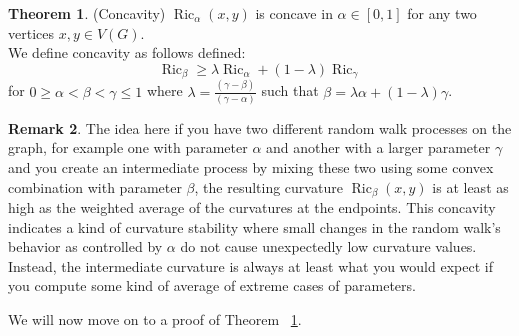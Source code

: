 \documentclass{Dissertate}
\theoremstyle{definition}
\newtheorem{theorem}{Theorem}[section]
\theoremstyle{definition} %
\theoremstyle{definition}
\newtheorem{remark}[theorem]{Remark}
\begin{document}
\begin{theorem} \label{thm: concavity}(Concavity) $\operatorname{Ric}_\alpha(x,y)$ is concave in $\alpha \in [0,1]$ for any two vertices $x,y \in V(G)$. \\
We define concavity as follows defined:
$$
\operatorname{Ric}_\beta \geq \lambda \operatorname{Ric}_\alpha + (1- \lambda) \operatorname{Ric}_\gamma
$$
for $0 \geq \alpha < \beta < \gamma \leq 1$ where
$\lambda = \frac{(\gamma - \beta)}{(\gamma - \alpha)}$ such that $\beta = \lambda\alpha + (1- \lambda)\gamma$.
\end{theorem}
\begin{remark} The idea here if you have two different random walk processes on the graph, for example one with parameter \(\alpha\) and another with a larger parameter \(\gamma\) and you create an intermediate process by mixing these two using some convex combination with parameter \(\beta\), the resulting curvature \(\operatorname{Ric}_\beta(x,y)\) is at least as high as the weighted average of the curvatures at the endpoints. This concavity indicates a kind of curvature stability where small changes in the random walk’s behavior as controlled by \(\alpha\) do not cause unexpectedly low curvature values. Instead, the intermediate curvature is always at least what you would expect if you compute some kind of average of extreme cases of parameters. 
\end{remark}
We will now move on to a proof of Theorem ~\ref{thm: concavity}. 
\end{document}
